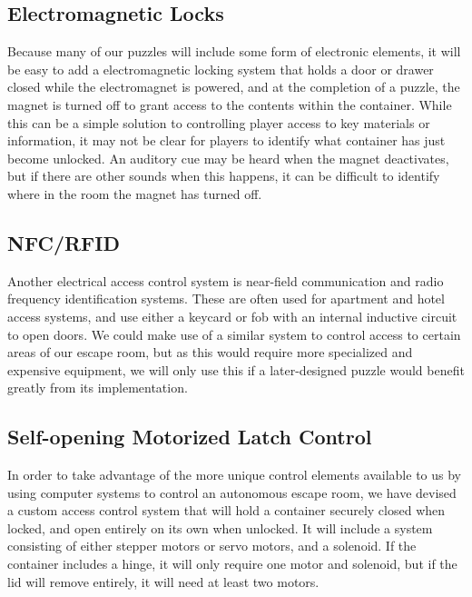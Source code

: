\documentclass[conference]{IEEEtran}
\begin{document}
\subsection{Electromagnetic Locks}
Because many of our puzzles will include some form of electronic elements, it will be easy to add a
electromagnetic locking system that holds a door or drawer closed while the electromagnet is powered,
and at the completion of a puzzle, the magnet is turned off to grant access to the contents within the
container. While this can be a simple solution to controlling player access to key materials or information,
it may not be clear for players to identify what container has just become unlocked. An auditory cue may
be heard when the magnet deactivates, but if there are other sounds when this happens, it can be difficult
to identify where in the room the magnet has turned off.

\subsection{NFC/RFID}
Another electrical access control system is near-field communication and radio frequency identification
systems. These are often used for apartment and hotel access systems, and use either a keycard or
fob with an internal inductive circuit to open doors. We could make use of a similar system to control
access to certain areas of our escape room, but as this would require more specialized and expensive
equipment, we will only use this if a later-designed puzzle would benefit greatly from its implementation.

\subsection{Self-opening Motorized Latch Control}
In order to take advantage of the more unique control elements available to us by using computer
systems to control an autonomous escape room, we have devised a custom access control system that
will hold a container securely closed when locked, and open entirely on its own when unlocked. It
will include a system consisting of either stepper motors or servo motors, and a solenoid. If the container
includes a hinge, it will only require one motor and solenoid, but if the lid will remove entirely,
it will need at least two motors.
\\
\end{document}
